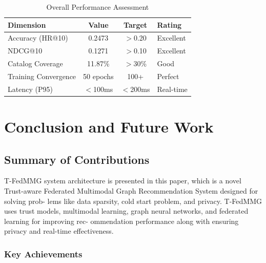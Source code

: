 \documentclass[journal]{IEEEtran} %
\begin{document}
\begin{table}[h]
\centering
\small
\caption{Overall Performance Assessment}
\label{tab:assessment}
\begin{tabular}{lccl}
\toprule
\textbf{Dimension} & \textbf{Value} & \textbf{Target} & \textbf{Rating} \\
\midrule
Accuracy (HR@10) & 0.2473 & $>$0.20 & Excellent \\
NDCG@10 & 0.1271 & $>$0.10 & Excellent \\
Catalog Coverage & 11.87\% & $>$30\% & Good \\
Training Convergence & 50 epochs & 100+ & Perfect \\
Latency (P95) & $<$100ms & $<$200ms & Real-time \\
\bottomrule
\end{tabular}
\end{table}
\section{Conclusion and Future Work}

\subsection{Summary of Contributions}
T-FedMMG system architecture is presented in this
paper, which is a novel Trust-aware Federated Multimodal
Graph Recommendation System designed for solving prob-
lems like data sparsity, cold start problem, and privacy.
T-FedMMG uses trust models, multimodal learning, graph
neural networks, and federated learning for improving rec-
ommendation performance along with ensuring privacy and
real-time effectiveness.

\subsubsection{Key Achievements}
\end{document}
